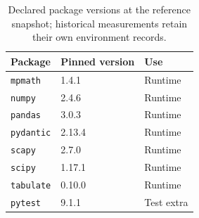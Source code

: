 \begin{table}[H]
\centering\small
\begin{tabular}{lll}
\toprule
\textbf{Package} & \textbf{Pinned version} & \textbf{Use} \\
\midrule
\texttt{mpmath} & 1.4.1 & Runtime \\
\texttt{numpy} & 2.4.6 & Runtime \\
\texttt{pandas} & 3.0.3 & Runtime \\
\texttt{pydantic} & 2.13.4 & Runtime \\
\texttt{scapy} & 2.7.0 & Runtime \\
\texttt{scipy} & 1.17.1 & Runtime \\
\texttt{tabulate} & 0.10.0 & Runtime \\
\texttt{pytest} & 9.1.1 & Test extra \\
\bottomrule
\end{tabular}
\caption{Declared package versions at the reference snapshot; historical measurements retain their own environment records.}
\end{table}
